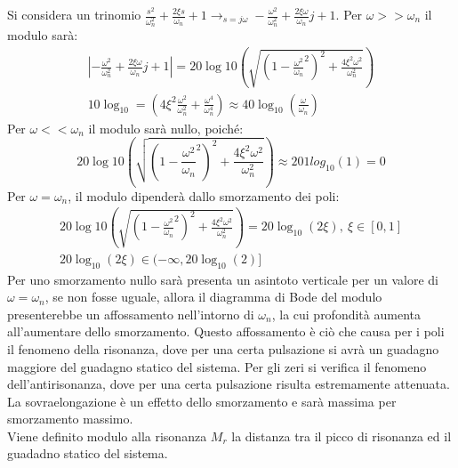 \documentclass{article}
\numberwithin{equation}{subsection}
\begin{document}
Si considera un trinomio $\displaystyle\frac{s^2}{\omega_n^2}+\frac{2\xi s}{\omega_n}+1\to_{s=j\omega}-\frac{\omega^2}{\omega_n^2}+\frac{2\xi\omega}{\omega_n}j+1$. 
Per $\omega>>\omega_n$ il modulo sarà: 
\begin{gather}
    \left|-\frac{\omega^2}{\omega_n^2}+\frac{2\xi\omega}{\omega_n}j+1\right|=20\log{10}\left(\sqrt{\left(1-\displaystyle\frac{\omega^2}{\omega_n}^2\right)^2+\frac{4\xi^2\omega^2}{\omega_n^2}}\right)\\
    10\log_{10}=\left(4\xi^2\displaystyle\frac{\omega^2}{\omega_n^2}+\frac{\omega^4}{\omega_n^4}\right)\approx40\log_{10}\left(\displaystyle\frac{\omega}{\omega_n}\right)
\end{gather}
Per $\omega<<\omega_n$ il modulo sarà nullo, poiché: 
\begin{equation}
    20\log{10}\left(\sqrt{\left(1-\displaystyle\frac{\omega^2}{\omega_n}^2\right)^2+\frac{4\xi^2\omega^2}{\omega_n^2}}\right)\approx201log_{10}(1)=0
\end{equation}
Per $\omega=\omega_n$, il modulo dipenderà dallo smorzamento dei poli:
\begin{gather}
    20\log{10}\left(\sqrt{\left(1-\displaystyle\frac{\omega^2}{\omega_n}^2\right)^2+\frac{4\xi^2\omega^2}{\omega_n^2}}\right)=20\log_{10}(2\xi),\:\xi\in[0,1]\\
    20\log_{10}(2\xi)\in(-\infty,20\log_{10}(2)]
\end{gather}
Per uno smorzamento nullo sarà presenta un asintoto verticale per un valore di $\omega=\omega_n$, se non fosse uguale, allora il diagramma di Bode del modulo presenterebbe 
un affossamento nell'intorno di $\omega_n$, la cui profondità aumenta all'aumentare dello smorzamento. Questo affossamento è ciò che causa per i poli il fenomeno della 
risonanza, dove per una certa pulsazione si avrà un guadagno maggiore del guadagno statico del sistema. Per gli zeri si verifica il fenomeno dell'antirisonanza, dove 
per una certa pulsazione risulta estremamente attenuata. La sovraelongazione è un effetto dello smorzamento e sarà massima per smorzamento massimo. \\
Viene definito modulo alla risonanza $M_r$ la distanza tra il picco di risonanza ed il guadadno statico del sistema. 

\begin{center}
\end{center}
\end{document}
